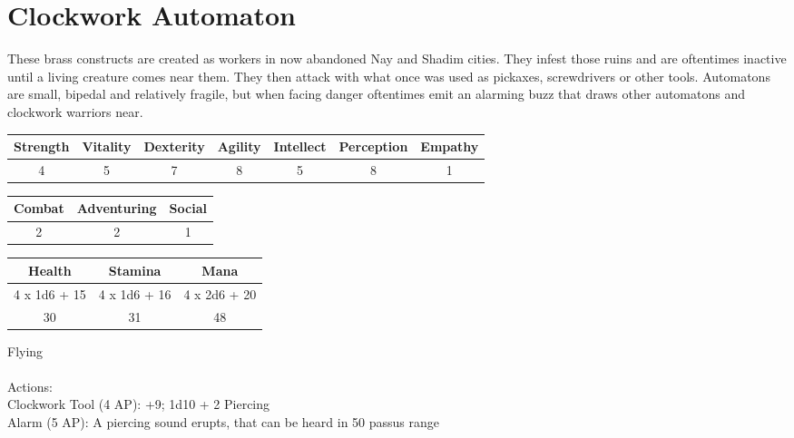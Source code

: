 \pagebreak
\section{Clockwork Automaton}

These brass constructs are created as workers in now abandoned Nay and Shadim cities. They infest those ruins and are oftentimes inactive until a living creature comes near them. They then attack with what once was used as pickaxes, screwdrivers or other tools.
Automatons are small, bipedal and relatively fragile, but when facing danger oftentimes emit an alarming buzz that draws other automatons and clockwork warriors near.\\

\begin{minipage}[H]{1\textwidth}
	\centering
	\begin{tabular}[c]{|c | c | c | c | c | c | c|}
		\hline
		Strength & Vitality & Dexterity & Agility & Intellect & Perception & Empathy\\
		\hline
		4 & 5 & 7 & 8 & 5 & 8 & 1\\
		\hline
	\end{tabular}
\end{minipage}
\bigbreak
\begin{minipage}[H]{1\textwidth}
	\centering
	\begin{tabular}[c]{|c | c | c|}
		\hline
		Combat & Adventuring & Social\\
		\hline
		2 & 2 & 1\\
		\hline
	\end{tabular}
\end{minipage}
\bigbreak
\begin{minipage}[H]{1\textwidth}
	\centering
	\begin{tabular}[c]{|c | c | c|}
		\hline
		Health & Stamina & Mana\\
		\hline
		4 x 1d6 + 15 & 4 x 1d6 + 16 & 4 x 2d6 + 20\\
		30 & 31 & 48\\
		\hline
	\end{tabular}
\end{minipage}
\noindent
Flying\\
\\
Actions:\\
Clockwork Tool (4 AP): +9; 1d10 + 2 Piercing\\
Alarm (5 AP): A piercing sound erupts, that can be heard in 50 passus range\\
